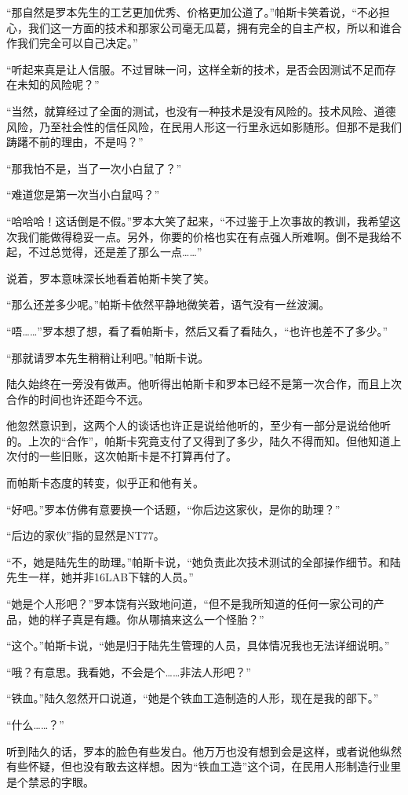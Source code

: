 “那自然是罗本先生的工艺更加优秀、价格更加公道了。”帕斯卡笑着说，“不必担心，我们这一方面的技术和那家公司毫无瓜葛，拥有完全的自主产权，所以和谁合作我们完全可以自己决定。”

“听起来真是让人信服。不过冒昧一问，这样全新的技术，是否会因测试不足而存在未知的风险呢？”

“当然，就算经过了全面的测试，也没有一种技术是没有风险的。技术风险、道德风险，乃至社会性的信任风险，在民用人形这一行里永远如影随形。但那不是我们踌躇不前的理由，不是吗？”

“那我怕不是，当了一次小白鼠了？”

“难道您是第一次当小白鼠吗？”

“哈哈哈！这话倒是不假。”罗本大笑了起来，“不过鉴于上次事故的教训，我希望这次我们能做得稳妥一点。另外，你要的价格也实在有点强人所难啊。倒不是我给不起，不过总觉得，还是差了那么一点……”

说着，罗本意味深长地看着帕斯卡笑了笑。

“那么还差多少呢。”帕斯卡依然平静地微笑着，语气没有一丝波澜。

“唔……”罗本想了想，看了看帕斯卡，然后又看了看陆久，“也许也差不了多少。”

“那就请罗本先生稍稍让利吧。”帕斯卡说。

陆久始终在一旁没有做声。他听得出帕斯卡和罗本已经不是第一次合作，而且上次合作的时间也许还距今不远。

他忽然意识到，这两个人的谈话也许正是说给他听的，至少有一部分是说给他听的。上次的“合作”，帕斯卡究竟支付了又得到了多少，陆久不得而知。但他知道上次付的一些旧账，这次帕斯卡是不打算再付了。

而帕斯卡态度的转变，似乎正和他有关。

“好吧。”罗本仿佛有意要换一个话题，“你后边这家伙，是你的助理？”

“后边的家伙”指的显然是NT77。

“不，她是陆先生的助理。”帕斯卡说，“她负责此次技术测试的全部操作细节。和陆先生一样，她并非16LAB下辖的人员。”

“她是个人形吧？”罗本饶有兴致地问道，“但不是我所知道的任何一家公司的产品，她的样子真是有趣。你从哪搞来这么一个怪胎？”

“这个。”帕斯卡说，“她是归于陆先生管理的人员，具体情况我也无法详细说明。”

“哦？有意思。我看她，不会是个……非法人形吧？”

“铁血。”陆久忽然开口说道，“她是个铁血工造制造的人形，现在是我的部下。”

“什么……？”

听到陆久的话，罗本的脸色有些发白。他万万也没有想到会是这样，或者说他纵然有些怀疑，但也没有敢去这样想。因为“铁血工造”这个词，在民用人形制造行业里是个禁忌的字眼。

